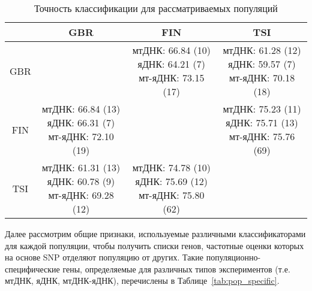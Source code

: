 \begin{table} [htbp]
	\centering
	\begin{threeparttable}
		\caption{Точность классификации для рассматриваемых популяций}%
		\label{tab:accuracy}%
		\begin{SingleSpace}
			\begin{tabular}{| c | c | c | c |}
				\hline
						 & GBR & FIN & TSI \\ \hline
				GBR      & & \thead{мтДНК: 66.84 (10) \\ яДНК: 64.21 (7) \\ мт-яДНК: 73.15 (17)}&\thead{мтДНК: 61.28 (12) \\ яДНК: 59.57 (7) \\ мт-яДНК: 70.18 (18)}\\ \hline
				FIN      & \thead{мтДНК: 66.84 (13) \\ яДНК: 66.31 (7) \\ мт-яДНК: 72.10 (19)}& &\thead{мтДНК: 75.23 (11) \\ яДНК: 75.71 (13) \\ мт-яДНК: 75.76 (69)} \\ \hline
				TSI      & \thead{мтДНК: 61.31 (13) \\ яДНК: 60.78 (9) \\ мт-яДНК: 69.28 (12)}& \thead{мтДНК: 74.78 (10) \\ яДНК: 75.69 (12) \\ мт-яДНК: 75.80 (62)}& \\ \hline
			\end{tabular}%
		\end{SingleSpace}
	\end{threeparttable}
\end{table}

Далее рассмотрим общие признаки, используемые различными классификаторами для каждой популяции, чтобы получить списки генов, частотные оценки которых на основе SNP отделяют популяцию от других. Такие популяционно-специфические гены, определяемые для различных типов экспериментов (т.е. мтДНК, яДНК, мтДНК-яДНК), перечислены в Таблице~\ref{tab:pop_specific}.

